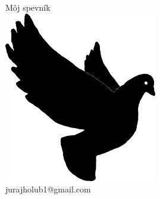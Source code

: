 \documentclass[10pt]{article}
\begin{document}
	
\begin{titlepage}
	\begin{center}
		{\Huge Môj spevník}
		\\
		\includegraphics[width=0.5\textwidth]{pigeon.pdf}
		\\ 
		jurajholub1@gmail.com
	\end{center}
\end{titlepage}

\begin{multicols}{2}
\tableofcontents
\end{multicols}

\newpage
\end{document}
